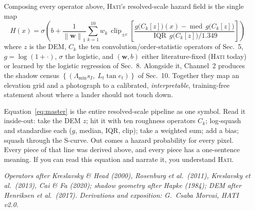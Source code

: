 \documentclass[11pt]{article}
\theoremstyle{definition}
\newcommand{\norm}[1]{\left\lVert #1 \right\rVert}
\newcommand{\set}[1]{\left\{ #1 \right\}}
\newcommand{\med}{\operatorname{med}}
\newcommand{\IQR}{\operatorname{IQR}}
\newcommand{\clip}{\operatorname{clip}}
\begin{document}
Composing every operator above, \textsc{Hati}'s resolved-scale hazard field is the
single map
\begin{equation}
\boxed{\;
H(x)=\sigma\!\left(b+\frac{1}{\norm{\mathbf w}_1}\sum_{k=1}^{10} w_k\,
\clip_{\pm c}\!\left[\frac{g\!\big(C_k[z]\big)(x)-\med\,g\!\big(C_k[z]\big)}{\IQR\,g\!\big(C_k[z]\big)/1.349}\right]\right)
\;}
\label{eq:master}
\end{equation}
where $z$ is the DEM, $C_k$ the ten convolution/order-statistic operators of Sec.~5,
$g=\log(1+\cdot)$, $\sigma$ the logistic, and $(\mathbf w,b)$ either literature-fixed
(\textsc{Hati} today) or learned by the logistic regression of Sec.~8. Alongside it,
Channel~2 produces the shadow census $\set{(\Lambda_{\min}s_I,\;L_t\tan e_t)}$ of
Sec.~10. Together they map an elevation grid and a photograph to a calibrated,
\emph{interpretable}, training-free statement about where a lander should not touch
down.

\begin{words}
Equation~\eqref{eq:master} is the entire resolved-scale pipeline as one symbol.
Read it inside-out: take the DEM $z$; hit it with ten roughness operators $C_k$;
log-squash and standardise each ($g$, median, IQR, clip); take a weighted sum;
add a bias; squash through the S-curve. Out comes a hazard probability for every
pixel. Every piece of that line was derived above, and every piece has a one-sentence
meaning. If you can read this equation and narrate it, you understand \textsc{Hati}.
\end{words}

\vfill
\begin{center}\footnotesize\itshape
Operators after Kreslavsky \& Head (2000), Rosenburg et al.\ (2011), Kreslavsky
et al.\ (2013), Cai \& Fa (2020); shadow geometry after Hapke (1984); DEM after
Henriksen et al.\ (2017). Derivations and exposition: G.\ Csaba Morvai, HATI v2.0.
\end{center}
\end{document}
